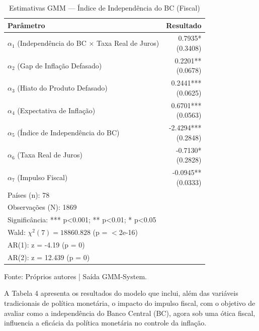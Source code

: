 \documentclass[a4paper,12pt]{article}
\begin{document}
\begin{table}[H]
    \centering
    \caption{Estimativas GMM — Índice de Independência do BC (Fiscal)}
    \label{tab:gmm_fiscal_estimates}
    \begin{tabular}{lr} 
        \toprule
        \textbf{Parâmetro} & \textbf{Resultado} \\
        \midrule
        $\alpha_1$ (Independência do BC $\times$ Taxa Real de Juros) & \makecell[r]{0.7935* \\ (0.3408)} \\
        $\alpha_2$ (Gap de Inflação Defasado) & \makecell[r]{0.2201** \\ (0.0678)} \\
        $\alpha_3$ (Hiato do Produto Defasado) & \makecell[r]{0.2441*** \\ (0.0625)} \\
        $\alpha_4$ (Expectativa de Inflação) & \makecell[r]{0.6701*** \\ (0.0563)} \\
        $\alpha_5$ (Índice de Independência do BC) & \makecell[r]{-2.4294*** \\ (0.2848)} \\
        $\alpha_6$ (Taxa Real de Juros) & \makecell[r]{-0.7130* \\ (0.2828)} \\
        $\alpha_7$ (Impulso Fiscal) & \makecell[r]{-0.0945** \\ (0.0333)} \\
        \midrule
        \multicolumn{2}{l}{Países (n): 78} \\
        \multicolumn{2}{l}{Observações (N): 1869} \\
        \multicolumn{2}{l}{Significância: *** p<0.001; ** p<0.01; * p<0.05} \\
        \multicolumn{2}{l}{Wald: $\chi^2(7) = 18860.828$ (p = $<$2e-16)} \\
        \multicolumn{2}{l}{AR(1): z = -4.19 (p = 0)} \\
        \multicolumn{2}{l}{AR(2): z = 12.439 (p = 0)} \\
        \bottomrule
    \end{tabular}

    \footnotesize{Fonte: Próprios autores | Saída GMM-System}.
\end{table}

A Tabela 4 apresenta os resultados do modelo que inclui, além das variáveis tradicionais de política monetária, o impacto do impulso fiscal, com o objetivo de avaliar como a independência do Banco Central (BC), agora sob uma ótica fiscal, influencia a eficácia da política monetária no controle da inflação.
\end{document}
